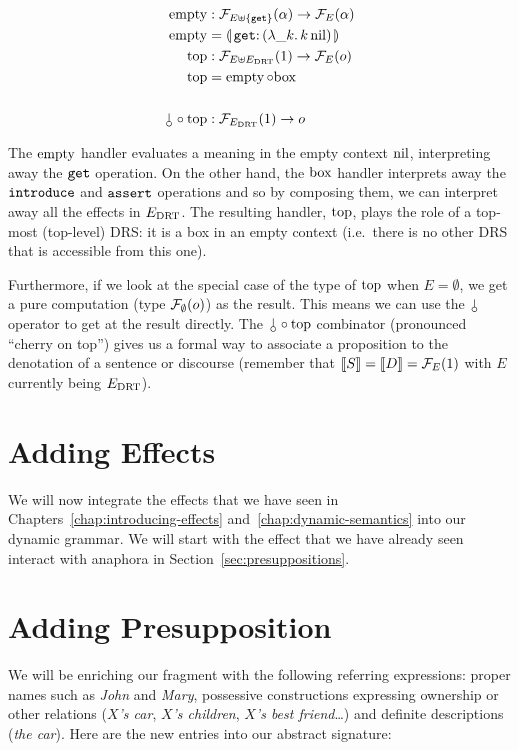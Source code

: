\begin{align*}
  \EMPTY &: \FF_{E \uplus \{\op{get}\}}(\alpha) \to \FF_E(\alpha) \\
  \EMPTY &= \banana{\onto{\op{get}}{(\lam{\_ k}{\ap{k}{\nil}})}} \\
  \TOP &: \FF_{E \uplus E_\DRT}(1) \to \FF_{E}(o) \\
  \TOP &= \EMPTY \comp \BOX \\
  \\
  \cherry \comp \TOP &: \FF_{E_\DRT}(1) \to o
\end{align*}

The $\operatorname{empty}$ handler evaluates a meaning in the empty context $\mathrm{nil}$,
interpreting away the $\mathtt{get}$ operation. On the other hand, the $\mathrm{box}$
handler interprets away the $\mathtt{introduce}$ and $\mathtt{assert}$ operations
and so by composing them, we can interpret away all the effects in
$E_{\mathrm{DRT}}$. The resulting handler, $\mathrm{top}$, plays the role of a top-most
(top-level) DRS: it is a box in an empty context (i.e.\ there is no other
DRS that is accessible from this one).

Furthermore, if we look at the special case of the type of $\mathrm{top}$ when
$E = \emptyset$, we get a pure computation (type $\mathcal{F}_\emptyset(o)$) as the
result. This means we can use the $\cherry$ operator to get at the result
directly. The $\cherry \comp \TOP$ combinator (pronounced ``cherry on
top'') gives us a formal way to associate a proposition to the denotation
of a sentence or discourse (remember that $\llbracket S \rrbracket = \llbracket D \rrbracket = \mathcal{F}_E(1)$
with $E$ currently being $E_{\mathrm{DRT}}$).


\section{Adding Effects}
\label{sec:adding-effects}

We will now integrate the effects that we have seen in
Chapters~\ref{chap:introducing-effects} and~\ref{chap:dynamic-semantics}
into our dynamic grammar. We will start with the effect that we have
already seen interact with anaphora in Section~\ref{sec:presuppositions}.


\section{Adding Presupposition}
\label{sec:adding-presupposition}

We will be enriching our fragment with the following referring expressions:
proper names such as \emph{John} and \emph{Mary}, possessive constructions
expressing ownership or other relations (\emph{$X$'s car}, \emph{$X$'s
  children}, \emph{$X$'s best friend}\ldots) and definite descriptions
(\emph{the car}). Here are the new entries into our abstract signature:

